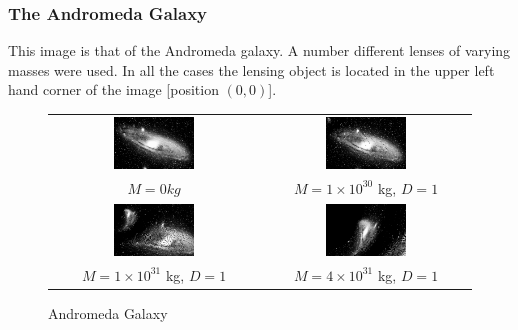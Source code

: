 \documentclass[a4paper]{IEEEtran}
\begin{document}
\subsubsection{The Andromeda Galaxy}     
This image is that of the Andromeda galaxy. A number different lenses
of varying masses were used. In all the cases the lensing object
is located in the upper left hand corner of the image [position $(0,0)$].

\begin{figure}
    \caption{Andromeda Galaxy} 
    \label{fig:andromeda} 
\begin{center}
    \begin{tabular}{cc} 
    \includegraphics[width=0.4\textwidth]{pics/andromeda.eps}  &
    \includegraphics[width=0.4\textwidth]{pics/1e30and.eps}  \\
    $M = 0 kg$ & $M = 1 \times 10^{30}$ kg, $D = 1$ \\ 
    \includegraphics[width=0.4\textwidth]{pics/1e31and.eps}  &
    \includegraphics[width=0.4\textwidth]{pics/4e31and.eps} \\
    $M = 1 \times 10^{31}$ kg, $D = 1$ &  $M = 4 \times 10^{31}$ kg, $D = 1$ \\ 
    \end{tabular} 
\end{center}
\end{figure}
\end{document}
